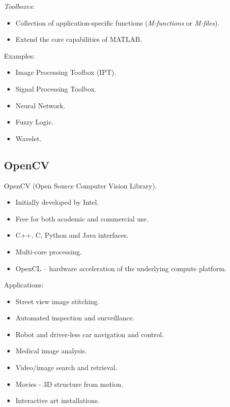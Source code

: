 
\begin{frame}
\textit{Toolboxes}:
\begin{itemize}
\item Collection of application-specific functions (\textit{M-functions} or \textit{M-files}).
\item Extend the core capabilities of MATLAB.
\end{itemize}
Examples:
\begin{itemize}
\item Image Processing Toolbox (IPT).
\item Signal Processing Toolbox.
\item Neural Network.
\item Fuzzy Logic.
\item Wavelet.
\end{itemize}
\end{frame}


\subsection{OpenCV}


\begin{frame}
OpenCV (Open Source Computer Vision Library).
\begin{itemize}
\item Initially developed by Intel.
\item Free for both academic and commercial use.
\item C++, C, Python and Java interfaces.
\item Multi-core processing.
\item OpenCL -- hardware acceleration of the underlying compute platform.
\end{itemize}
\end{frame}


\begin{frame}
Applications:
\begin{itemize}
\item Street view image stitching.
\item Automated inspection and surveillance.
\item Robot and driver-less car navigation and control.
\item Medical image analysis.
\item Video/image search and retrieval.
\item Movies - 3D structure from motion.
\item Interactive art installations.
\end{itemize}
\end{frame}

